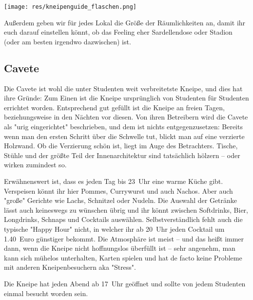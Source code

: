 {\begin{multicols*}{2}
\begin{center}
	\texttt{[image: res/kneipenguide\_flaschen.png]}
\end{center}

Außerdem geben wir für jedes Lokal die Größe der Räumlichkeiten an, damit ihr euch darauf einstellen könnt, ob das Feeling eher Sardellendose oder Stadion (oder am besten irgendwo dazwischen) ist.

\subsection{Cavete}
Die Cavete ist wohl die unter Studenten weit verbreitetste Kneipe, und dies hat ihre Gründe: Zum Einen ist die Kneipe ursprünglich von Studenten für Studenten errichtet worden.
Entsprechend gut gefüllt ist die Kneipe an freien Tagen, beziehungsweise in den Nächten vor diesen.
Von ihren Betreibern wird die Cavete als "urig eingerichtet" beschrieben, und dem ist nichts entgegenzusetzen:
Bereits wenn man den ersten Schritt über die Schwelle tut, blickt man auf eine verzierte Holzwand.
Ob die Verzierung schön ist, liegt im Auge des Betrachters.
Tische, Stühle und der größte Teil der Innenarchitektur sind tatsächlich hölzern -- oder wirken zumindest so.

Erwähnenswert ist, dass es jeden Tag bis 23~Uhr eine warme Küche gibt.
Verspeisen könnt ihr hier Pommes, Currywurst und auch Nachos.
Aber auch "große" Gerichte wie Lachs, Schnitzel oder Nudeln.
Die Auswahl der Getränke lässt auch keineswegs zu wünschen übrig und ihr könnt zwischen Softdrinks, Bier, Longdrinks, Schnaps und Cocktails auswählen.
Selbstverständlich fehlt auch die typische "Happy Hour" nicht, in welcher ihr ab 20~Uhr jeden Cocktail um \num{1,40}~Euro günstiger bekommt.
Die Atmosphäre ist meist -- und das heißt immer dann, wenn die Kneipe nicht hoffnungslos überfüllt ist -- sehr angenehm, man kann sich mühelos unterhalten, Karten spielen und hat de facto keine Probleme mit anderen Kneipenbesuchern aka "Stress".

Die Kneipe hat jeden Abend ab 17~Uhr geöffnet und sollte von jedem Studenten
einmal besucht worden sein.

\begin{center}
\end{center}


\end{multicols*}}
